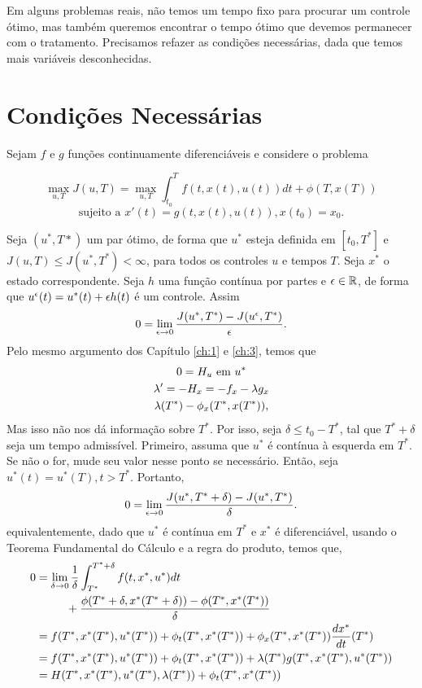 Em alguns problemas reais, não temos um tempo fixo para procurar um controle
ótimo, mas também queremos encontrar o tempo ótimo que devemos permanecer com
o tratamento. Precisamos refazer as condições necessárias, dada que temos mais
variáveis desconhecidas.  

\section{Condições Necessárias}

Sejam $f$ e $g$ funções continuamente diferenciáveis e considere o problema 

$$
\max_{u,T} J(u,T) = \max_{u,T} \int_{t_0}^T f(t, x(t), u(t))dt + \phi(T, x(T))
$$
$$
\text{sujeito a   }x'(t) = g(t, x(t), u(t)), x(t_0) = x_0.
$$

Seja $(u^*, T*)$ um par ótimo, de forma que $u^*$ esteja definida em $[t_0,
T^*]$ e $J(u, T) \le J(u^*, T^*) < \infty$, para todos os controles $u$ e
tempos $T$. Seja $x^*$ o estado correspondente. Seja $h$ uma função contínua
por partes e $\epsilon \in \mathbb{R}$, de forma que $u^{\epsilon}(t) = u^*(t) + \epsilon h(t)$
é um controle. Assim 
\begin{equation*}
    0 = \lim_{\epsilon \to 0} \frac{J(u^*, T^*) - J(u^{\epsilon}, T^*)}{\epsilon}.
\end{equation*}
Pelo mesmo argumento dos Capítulo \ref{ch:1} e \ref{ch:3}, temos que 
\begin{gather*}
    0 = H_u \text{ em } u^* \\
    \lambda ' = - H_x = -f_x - \lambda g_x \\
    \lambda(T^*) - \phi_x(T^*, x(T^*)),
\end{gather*}
Mas isso não nos dá informação sobre $T^*$. Por isso, seja $\delta \le t_0 -
T^*$, tal que $T^* + \delta$ seja um tempo admissível. Primeiro, assuma que
$u^*$ é contínua à esquerda em $T^*$. Se não o for, mude seu valor nesse ponto
se necessário. Então, seja $u^*(t) = u^*(T), t > T^*$. Portanto, 
\begin{equation*}
    0 = \lim_{\epsilon \to 0} \frac{J(u^*, T^* + \delta) - J(u^*, T^*)}{\delta}.
\end{equation*}
equivalentemente, dado que $u^*$ é contínua em $T^*$ e $x^*$ é diferenciável,
usando o Teorema Fundamental do Cálculo e a regra do produto, temos que, 
\begin{equation*}
    \begin{split}
        0 &= \lim_{\delta \to 0} \frac{1}{\delta}\int_{T^*}^{T^* + \delta} f(t, x^*, u^*) dt \\ 
        &~~~~~~~~+ \frac{\phi(T^* + \delta, x^*(T^* + \delta)) - \phi(T^*, x^*(T^*))}{\delta} \\
        &= f(T^*, x^*(T^*), u^*(T^*)) + \phi_t(T^*, x^*(T^*)) + \phi_x(T^*, x^*(T^*))\frac{dx^*}{dt}(T^*) \\
        &=  f(T^*, x^*(T^*), u^*(T^*)) + \phi_t(T^*, x^*(T^*)) + \lambda(T^*)g(T^*, x^*(T^*), u^*(T^*)) \\
        &= H(T^*, x^*(T^*), u^*(T^*), \lambda(T^*)) + \phi_t(T^*, x^*(T^*))
    \end{split}
\end{equation*}

